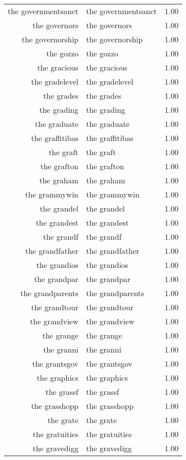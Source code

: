 \begin{table}[ht]
\begin{tabular}{rlr}
  the governmentsanct & the governmentsanct & 1.00 \\ 
  the governors & the governors & 1.00 \\ 
  the governorship & the governorship & 1.00 \\ 
  the gozzo & the gozzo & 1.00 \\ 
  the gracious & the gracious & 1.00 \\ 
  the gradelevel & the gradelevel & 1.00 \\ 
  the grades & the grades & 1.00 \\ 
  the grading & the grading & 1.00 \\ 
  the graduate & the graduate & 1.00 \\ 
  the graffitibas & the graffitibas & 1.00 \\ 
  the graft & the graft & 1.00 \\ 
  the grafton & the grafton & 1.00 \\ 
  the graham & the graham & 1.00 \\ 
  the grammywin & the grammywin & 1.00 \\ 
  the grandel & the grandel & 1.00 \\ 
  the grandest & the grandest & 1.00 \\ 
  the grandf & the grandf & 1.00 \\ 
  the grandfather & the grandfather & 1.00 \\ 
  the grandios & the grandios & 1.00 \\ 
  the grandpar & the grandpar & 1.00 \\ 
  the grandparents & the grandparents & 1.00 \\ 
  the grandtour & the grandtour & 1.00 \\ 
  the grandview & the grandview & 1.00 \\ 
  the grange & the grange & 1.00 \\ 
  the granni & the granni & 1.00 \\ 
  the grantsgov & the grantsgov & 1.00 \\ 
  the graphics & the graphics & 1.00 \\ 
  the grassf & the grassf & 1.00 \\ 
  the grasshopp & the grasshopp & 1.00 \\ 
  the grate & the grate & 1.00 \\ 
  the gratuities & the gratuities & 1.00 \\ 
  the gravedigg & the gravedigg & 1.00 \\ 

\end{tabular}
\end{table}
